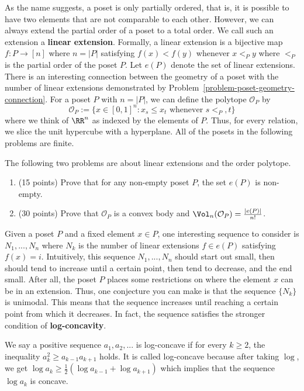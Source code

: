\documentclass[11pt]{article}
\begin{document}
As the name suggests, a poset is only partially ordered, that is, it is possible to have two elements that are not comparable to each other. However, we can always extend the partial order of a poset to a total order. We call such an extension a \textbf{linear extension}. Formally, a linear extension is a bijective map $f : P \to [n]$ where $n = |P|$ satisfying $f(x) < f(y)$ whenever $x <_P y$ where $<_P$ is the partial order of the poset $P$. Let $e(P)$ denote the set of linear extensions. There is an interesting connection between the geometry of a poset with the number of linear extensions demonstrated by Problem~\ref{problem-poset-geometry-connection}. For a poset $P$ with $n  = |P|$, we can define the polytope $\mathcal{O}_P$ by
\[
    \mathcal{O}_P := \{x \in [0, 1]^n : x_s \leq x_t \text{ whenever $s <_P, t$}\}
\]
where we think of $\RR^n$ as indexed by the elements of $P$. Thus, for every relation, we slice the unit hypercube with a hyperplane. All of the posets in the following problems are finite. 
\begin{prob} [45 points] \label{problem-poset-geometry-connection}
    The following two problems are about linear extensions and the order polytope. 
    \begin{enumerate}[label = (\alph*)]
        \item (15 points) Prove that for any non-empty poset $P$, the set $e(P)$ is non-empty. 
        \item (30 points) Prove that $\mathcal{O}_P$ is a convex body and $\Vol_n(\mathcal{O}_P) = \frac{|e(P)|}{n!}$.
    \end{enumerate}
\end{prob}

Given a poset $P$ and a fixed element $x \in P$, one interesting sequence to consider is $N_1, ..., N_n$ where $N_k$ is the number of linear extensions $f \in e(P)$ satisfying $f(x) = i$. Intuitively, this sequence $N_1, ..., N_n$ should start out small, then should tend to increase until a certain point, then tend to decrease, and the end small. After all, the poset $P$ places some restrictions on where the element $x$ can be in an extension. Thus, one conjecture you can make is that the sequence $\{N_k\}$ is unimodal. This means that the sequence increases until reaching a certain point from which it decreases. In fact, the sequence satisfies the stronger condition of \textbf{log-concavity}. 

We say a positive sequence $a_1, a_2, ...$ is log-concave if for every $k \geq 2$, the inequality $a_k^2 \geq a_{k-1}a_{k+1}$ holds. It is called log-concave because after taking $\log$, we get $\log a_k \geq \frac{1}{2} (\log a_{k-1} + \log a_{k+1})$ which implies that the sequence $\log a_k$ is concave. 
\end{document}

